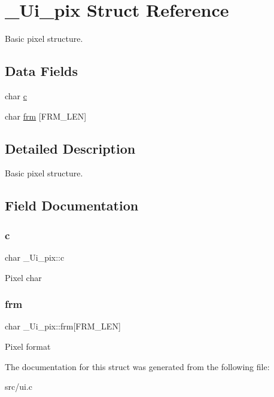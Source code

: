 \hypertarget{struct__Ui__pix}{}\section{\+\_\+\+Ui\+\_\+pix Struct Reference}
\label{struct__Ui__pix}


Basic pixel structure.  


\subsection*{Data Fields}
\begin{DoxyCompactItemize}
\item 
char \hyperlink{struct__Ui__pix_aa12b962b28524e2f295d0fd90b9595a8}{c}
\item 
char \hyperlink{struct__Ui__pix_a0e503eb95fbe667b3c97e39dbad54649}{frm} \mbox{[}F\+R\+M\+\_\+\+L\+EN\mbox{]}
\end{DoxyCompactItemize}


\subsection{Detailed Description}
Basic pixel structure. 

\subsection{Field Documentation}
\mbox{\label{struct__Ui__pix_aa12b962b28524e2f295d0fd90b9595a8}} 
\subsubsection{\texorpdfstring{c}{c}}
{\footnotesize\ttfamily char \+\_\+\+Ui\+\_\+pix\+::c}

Pixel char \mbox{\label{struct__Ui__pix_a0e503eb95fbe667b3c97e39dbad54649}} 
\subsubsection{\texorpdfstring{frm}{frm}}
{\footnotesize\ttfamily char \+\_\+\+Ui\+\_\+pix\+::frm\mbox{[}F\+R\+M\+\_\+\+L\+EN\mbox{]}}

Pixel format 

The documentation for this struct was generated from the following file\+:\begin{DoxyCompactItemize}
\item 
src/ui.\+c\end{DoxyCompactItemize}
